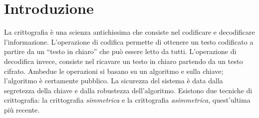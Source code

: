 \section{Introduzione}

La crittografia è una scienza antichissima che consiste nel codificare e
decodificare l'informazione.
L'operazione di codifica permette di ottenere un testo codificato a partire da
un ``testo in chiaro'' che
può essere letto da tutti.
L'operazione di decodifica invece, consiste nel ricavare un testo in chiaro
partendo da un
testo cifrato. Ambedue le operazioni si basano su un algoritmo e sulla chiave;
l'algoritmo è
certamente pubblico. La sicurezza del sistema è data dalla segretezza della
chiave e dalla
robustezza dell'algoritmo. Esistono due tecniche di crittografia:
la crittografia \textit{simmetrica} e la
crittografia \textit{asimmetrica}, quest'ultima più recente.
